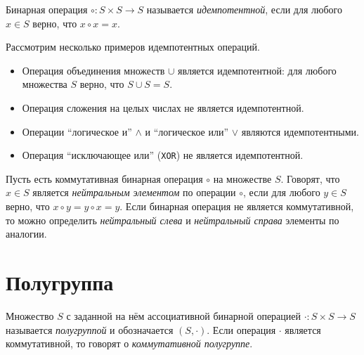 \begin{definition}
	Бинарная операция $\circ : S \times S \to S$ называется \emph{идемпотентной}, если для любого  $x \in S$ верно, что  $x \circ x = x$.
\end{definition}



\begin{example} Рассмотрим несколько примеров идемпотентных операций.

	\begin{itemize}
		\item Операция объединения множеств $\cup$ является идемпотентной: для любого множества $S$ верно, что $S \cup S = S$.
		\item Операция сложения на целых числах не является идемпотентной.
		\item Операции ``логическое и'' $\wedge$ и ``логическое или'' $\vee$ являются идемпотентными.
		\item Операция ``исключающее или'' (\texttt{XOR}) не является идемпотентной.
	\end{itemize}

\end{example}

\begin{definition}
	Пусть есть коммутативная бинарная операция $\circ$ на множестве $S$. Говорят, что $x\in S$ является \emph{нейтральным элементом} по операции $\circ$, если для любого $y\in S$ верно, что $x \circ y = y \circ x = y$. Если бинарная операция не является коммутативной, то можно определить \textit{нейтральный слева} и \textit{нейтральный справа} элементы по аналогии.
\end{definition}


\section{Полугруппа}


\begin{definition}
	Множество $S$ с заданной на нём ассоциативной бинарной операцией $\cdot : S \times S \to S$ называется \emph{полугруппой} и обозначается $(S, \cdot)$.
	Если операция $\cdot$ является коммутативной, то говорят о \textit{коммутативной полугруппе}.
\end{definition}


